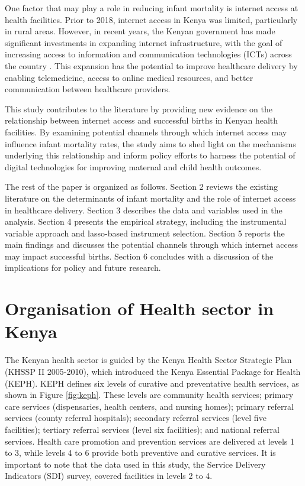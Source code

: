 \documentclass[12pt]{article}
\begin{document}
One factor that may play a role in reducing infant mortality is internet access at health facilities. Prior to 2018, internet access in Kenya was limited, particularly in rural areas. However, in recent years, the Kenyan government has made significant investments in expanding internet infrastructure, with the goal of increasing access to information and communication technologies (ICTs) across the country \citep{MinistryICT2019}. This expansion has the potential to improve healthcare delivery by enabling telemedicine, access to online medical resources, and better communication between healthcare providers.

This study contributes to the literature by providing new evidence on the relationship between internet access and successful births in Kenyan health facilities. By examining potential channels through which internet access may influence infant mortality rates, the study aims to shed light on the mechanisms underlying this relationship and inform policy efforts to harness the potential of digital technologies for improving maternal and child health outcomes.

The rest of the paper is organized as follows. Section 2 reviews the existing literature on the determinants of infant mortality and the role of internet access in healthcare delivery. Section 3 describes the data and variables used in the analysis. Section 4 presents the empirical strategy, including the instrumental variable approach and lasso-based instrument selection. Section 5 reports the main findings and discusses the potential channels through which internet access may impact successful births. Section 6 concludes with a discussion of the implications for policy and future research.

\section{Organisation of Health sector in Kenya}

The Kenyan health sector is guided by the Kenya Health Sector Strategic Plan (KHSSP II 2005-2010), which introduced the Kenya Essential Package for Health (KEPH). KEPH defines six levels of curative and preventative health services, as shown in Figure \ref{fig:keph}. These levels are community health services; primary care services (dispensaries, health centers, and nursing homes); primary referral services (county referral hospitals); secondary referral services (level five facilities); tertiary referral services (level six facilities); and national referral services. Health care promotion and prevention services are delivered at levels 1 to 3, while levels 4 to 6 provide both preventive and curative services. It is important to note that the data used in this study, the Service Delivery Indicators (SDI) survey, covered facilities in levels 2 to 4.
\end{document}
